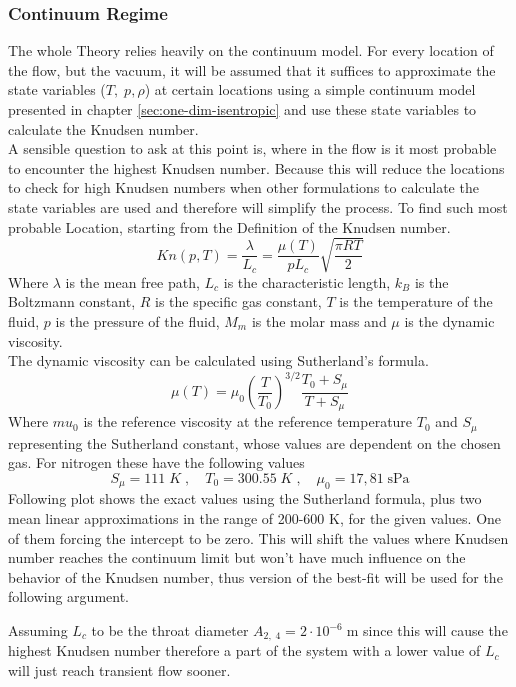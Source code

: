 \subsubsection*{Continuum Regime}
	The whole Theory relies heavily on the continuum model.
	For every location of the flow, but the vacuum, it will be assumed that it suffices to approximate the state variables ($T,\; p, \rho$) at certain locations using a simple continuum model presented in chapter \ref{sec:one-dim-isentropic} and use these state variables to calculate the Knudsen number.\\
	A sensible question to ask at this point is, where in the flow is it most probable to encounter the highest Knudsen number.
	Because this will reduce the locations to check for high Knudsen numbers when other formulations to calculate the state variables are used and therefore will simplify the process.
	To find such most probable Location, starting from the Definition of the Knudsen number.
	\cite{halwidl_development_2016, anderson2021modern}
	$$
		Kn(p,T) = \frac{\lambda}{L_c} = \frac{\mu(T)}{pL_c}\sqrt{\frac{\pi R T}{2}}
	$$
	Where $\lambda$ is the mean free path, $L_c$ is the characteristic length, $k_B$ is the Boltzmann constant, $R$ is the specific gas constant, $T$ is the temperature of the fluid, $p$ is the pressure of the fluid, $M_m$ is the molar mass and $\mu$ is the dynamic viscosity.\\
	The dynamic viscosity can be calculated using Sutherland's formula. \cite{Hirschfelder1954MolecularTO}
	\begin{equation}
		\mu(T) = \mu_0 \left(\frac{T}{T_0}\right)^{3/2} \frac{T_0 + S_\mu}{T + S_\mu}
		\label{eq:sutherland}
	\end{equation}
	Where $mu_0$ is the reference viscosity at the reference temperature $T_0$ and $S_\mu$ representing the Sutherland constant, whose values are dependent on the chosen gas. For nitrogen these have the following values \cite{kim2004numericalanalysisflowcharacteristics}
	$$
		S_\mu = 111\;K\;,\quad T_0 = 300.55\;K\;,\quad\mu_0 = 17,81\; \text{sPa} 
	$$
	Following plot shows the exact values using the Sutherland formula, plus two mean linear approximations in the range of 200-600 K, for the given values.
	One of them forcing the intercept to be zero.
	This will shift the values where Knudsen number reaches the continuum limit but won't have much influence on the behavior of the Knudsen number, thus version of the best-fit will be used for the following argument.
	
	Assuming $L_c$ to be the throat diameter $A_{2,\;4} = 2 \cdot 10^{-6}\; \text{m}$ since this will cause the highest Knudsen number therefore a part of the system with a lower value of $L_c$ will just reach transient flow sooner.
